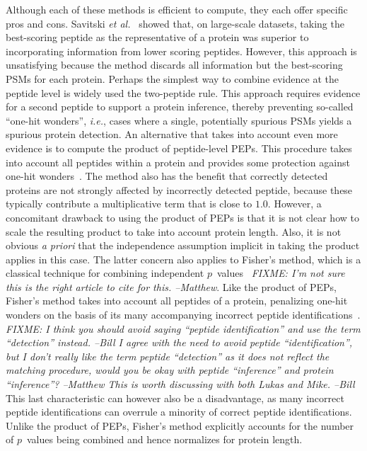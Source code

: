 \documentclass{article}
\begin{document}
Although each of these methods is efficient to compute, they each
offer specific pros and cons.  Savitski {\em et
  al.}~\cite{savitski2015scalable} showed that, on large-scale
datasets, taking the best-scoring peptide as the representative of a
protein was superior to incorporating information from lower scoring
peptides. However, this approach is unsatisfying because the method
discards all information but the best-scoring PSMs for each protein.
Perhaps the simplest way to combine evidence at the peptide level is
widely used the two-peptide rule.  This approach requires evidence for
a second peptide to support a protein inference, thereby preventing
so-called ``one-hit wonders'', {\em i.e.}, cases where a single,
potentially spurious PSMs yields a spurious protein detection.  An
alternative that takes into account even more evidence is to compute
the product of peptide-level PEPs. This procedure takes into account
all peptides within a protein and provides some protection against
one-hit wonders~\cite{cox2008maxquant}. The method also has the
benefit that correctly detected proteins are not strongly affected by
incorrectly detected peptide, because these typically contribute a
multiplicative term that is close to $1.0$. However, a concomitant
drawback to using the product of PEPs is that it is not clear how to
scale the resulting product to take into account protein length.
Also, it is not obvious {\em a priori} that the independence
assumption implicit in taking the product applies in this case.  The
latter concern also applies to Fisher's method, which is a classical
technique for combining independent
$p$~values~\cite{fisher1925statistical} {\em FIXME: I'm not sure this
  is the right article to cite for this. --Matthew}. Like the product
of PEPs, Fisher's method takes into account all peptides of a protein,
penalizing one-hit wonders on the basis of its many accompanying
incorrect peptide identifications~\cite{spirin2011assigning,
  alves2015mass, granholm2013determining}. {\em FIXME: I think you
  should avoid saying ``peptide identification'' and use the term
  ``detection'' instead. --Bill I agree with the need to avoid peptide
  ``identification'', but I don't really like the term peptide
  ``detection'' as it does not reflect the matching procedure, would
  you be okay with peptide ``inference'' and protein ``inference''?
  --Matthew This is worth discussing with both Lukas and Mike. --Bill}
This last characteristic can however also be a disadvantage, as many
incorrect peptide identifications can overrule a minority of correct
peptide identifications.  Unlike the product of PEPs, Fisher's method
explicitly accounts for the number of $p$~values being combined and
hence normalizes for protein length.
\end{document}

